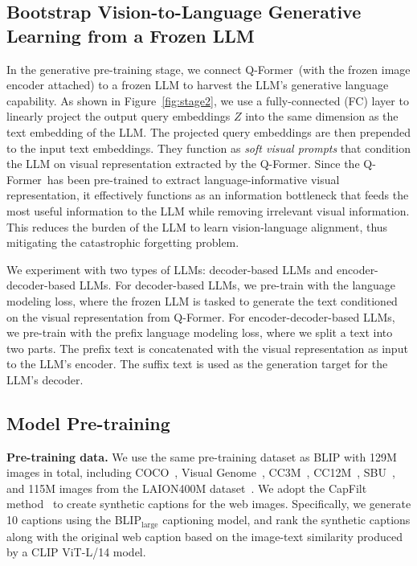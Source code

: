 \subsection{Bootstrap Vision-to-Language Generative Learning from a Frozen LLM}

In the generative pre-training stage, we connect Q-Former~(with the frozen image encoder attached) to a frozen LLM to harvest the LLM's generative language capability. As shown in Figure~\ref{fig:stage2},
we use a fully-connected (FC) layer to linearly project the output query embeddings $Z$ into the same dimension as the text embedding of the LLM. The projected query embeddings are then prepended to the input text embeddings. They function as \textit{soft visual prompts} that condition the LLM on visual representation extracted by the Q-Former. Since the Q-Former~has been pre-trained to extract language-informative visual representation, it effectively functions as an information bottleneck that feeds the most useful information to the LLM while removing irrelevant visual information. This reduces the burden of the LLM to learn vision-language alignment, thus mitigating the catastrophic forgetting problem.

We experiment with two types of LLMs: decoder-based LLMs and encoder-decoder-based LLMs. For decoder-based LLMs, we pre-train with the language modeling loss, where the frozen LLM is tasked to generate the text conditioned on the visual representation from Q-Former. For encoder-decoder-based LLMs, we pre-train with the prefix language modeling loss, where we split a text into two parts. The prefix text is concatenated with the visual representation as input to the LLM's encoder. The suffix text is used as the generation target for the LLM's decoder.

\subsection{Model Pre-training}

\textbf{Pre-training data.} We use the same pre-training dataset as BLIP with 129M images in total, including COCO~\cite{coco}, Visual Genome~\cite{VG}, CC3M~\cite{CC}, CC12M~\cite{cc12m}, SBU~\cite{sbu}, and 115M images from the LAION400M dataset~\cite{laion}. We adopt the CapFilt method~\cite{blip} to create synthetic captions for the web images. Specifically, we generate 10 captions using the BLIP$_\mathrm{large}$ captioning model, and rank the synthetic captions along with the original web caption based on the image-text similarity produced by a CLIP ViT-L/14 model.


